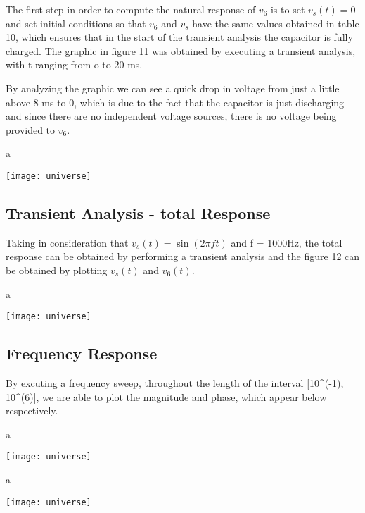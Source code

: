 The first step in order to compute the natural response of $v_6$ is to set $v_s(t) = 0$ and set initial conditions so that $v_6$ and $v_s$ have the same values obtained in table 10, which ensures that in the start of the transient analysis the capacitor is fully charged. The graphic in figure 11 was obtained by executing a transient analysis, with t ranging from o to 20 ms.

By analyzing the graphic we can see a quick drop in voltage from just a little above 8 ms to 0, which is due to the fact that the capacitor is just discharging and since there are no independent voltage sources, there is no voltage being provided to $v_6$.

\graphicspath{ {./images/} }

a

\texttt{[image: universe]}

\subsection{Transient Analysis - total Response}

Taking in consideration that $v_s(t) = \sin(2\pi ft)$ and f = 1000Hz, the total response can be obtained by performing a transient analysis and the figure 12 can be obtained by plotting $v_s(t)$ and $v_6(t)$. 

\graphicspath{ {./images/} }

a

\texttt{[image: universe]}

\subsection{Frequency Response}

By excuting a frequency sweep, throughout the length of the interval [10^(-1), 10^(6)], we are able to plot the magnitude and phase, which appear below respectively.

\graphicspath{ {./images/} }

a

\texttt{[image: universe]}


\graphicspath{ {./images/} }

a

\texttt{[image: universe]}
